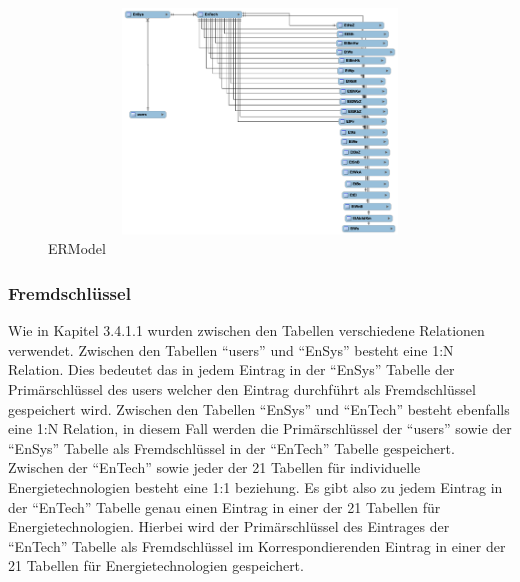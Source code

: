 \begin{figure}[h]
	\centering
	\includegraphics[height=6cm,width=18cm]{images/ERModel}
	\caption{ERModel}
	\label{fig:ERModel}
\end{figure}
\newpage
\subsubsection{Fremdschlüssel}
Wie in Kapitel 3.4.1.1 wurden zwischen den Tabellen verschiedene Relationen verwendet. Zwischen den Tabellen “users” und “EnSys” besteht eine 1:N Relation. Dies bedeutet das in jedem Eintrag in der “EnSys” Tabelle der Primärschlüssel des users welcher den Eintrag durchführt als Fremdschlüssel gespeichert wird. Zwischen den Tabellen “EnSys” und “EnTech” besteht ebenfalls eine 1:N Relation, in diesem Fall werden die Primärschlüssel der “users” sowie der “EnSys” Tabelle als Fremdschlüssel in der “EnTech” Tabelle gespeichert. Zwischen der “EnTech” sowie jeder der 21 Tabellen für individuelle Energietechnologien besteht eine 1:1 beziehung. Es gibt also zu jedem Eintrag in der “EnTech” Tabelle genau einen Eintrag in einer der 21 Tabellen für Energietechnologien. Hierbei wird der Primärschlüssel des Eintrages der “EnTech” Tabelle als Fremdschlüssel im Korrespondierenden Eintrag in einer der 21 Tabellen für Energietechnologien gespeichert.



